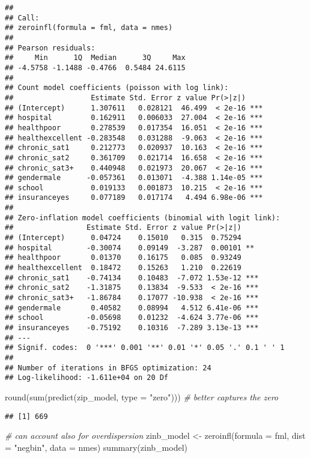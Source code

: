 \documentclass[
  oneside]{book}
\newenvironment{Shaded}{\begin{snugshade}}{\end{snugshade}}
\newcommand{\AttributeTok}[1]{\textcolor[rgb]{0.77,0.63,0.00}{#1}}
\newcommand{\CommentTok}[1]{\textcolor[rgb]{0.56,0.35,0.01}{\textit{#1}}}
\newcommand{\FunctionTok}[1]{\textcolor[rgb]{0.00,0.00,0.00}{#1}}
\newcommand{\NormalTok}[1]{#1}
\newcommand{\OtherTok}[1]{\textcolor[rgb]{0.56,0.35,0.01}{#1}}
\newcommand{\StringTok}[1]{\textcolor[rgb]{0.31,0.60,0.02}{#1}}
\begin{document}
\begin{verbatim}
## 
## Call:
## zeroinfl(formula = fml, data = nmes)
## 
## Pearson residuals:
##     Min      1Q  Median      3Q     Max 
## -4.5758 -1.1488 -0.4766  0.5484 24.6115 
## 
## Count model coefficients (poisson with log link):
##                  Estimate Std. Error z value Pr(>|z|)    
## (Intercept)      1.307611   0.028121  46.499  < 2e-16 ***
## hospital         0.162911   0.006033  27.004  < 2e-16 ***
## healthpoor       0.278539   0.017354  16.051  < 2e-16 ***
## healthexcellent -0.283548   0.031288  -9.063  < 2e-16 ***
## chronic_sat1     0.212773   0.020937  10.163  < 2e-16 ***
## chronic_sat2     0.361709   0.021714  16.658  < 2e-16 ***
## chronic_sat3+    0.440948   0.021973  20.067  < 2e-16 ***
## gendermale      -0.057361   0.013071  -4.388 1.14e-05 ***
## school           0.019133   0.001873  10.215  < 2e-16 ***
## insuranceyes     0.077189   0.017174   4.494 6.98e-06 ***
## 
## Zero-inflation model coefficients (binomial with logit link):
##                 Estimate Std. Error z value Pr(>|z|)    
## (Intercept)      0.04724    0.15010   0.315  0.75294    
## hospital        -0.30074    0.09149  -3.287  0.00101 ** 
## healthpoor       0.01370    0.16175   0.085  0.93249    
## healthexcellent  0.18472    0.15263   1.210  0.22619    
## chronic_sat1    -0.74134    0.10483  -7.072 1.53e-12 ***
## chronic_sat2    -1.31875    0.13834  -9.533  < 2e-16 ***
## chronic_sat3+   -1.86784    0.17077 -10.938  < 2e-16 ***
## gendermale       0.40582    0.08994   4.512 6.41e-06 ***
## school          -0.05698    0.01232  -4.624 3.77e-06 ***
## insuranceyes    -0.75192    0.10316  -7.289 3.13e-13 ***
## ---
## Signif. codes:  0 '***' 0.001 '**' 0.01 '*' 0.05 '.' 0.1 ' ' 1 
## 
## Number of iterations in BFGS optimization: 24 
## Log-likelihood: -1.611e+04 on 20 Df
\end{verbatim}

\begin{Shaded}
\begin{Highlighting}[]
\FunctionTok{round}\NormalTok{(}\FunctionTok{sum}\NormalTok{(}\FunctionTok{predict}\NormalTok{(zip\_model, }\AttributeTok{type =} \StringTok{"zero"}\NormalTok{))) }\CommentTok{\# better captures the zero}
\end{Highlighting}
\end{Shaded}

\begin{verbatim}
## [1] 669
\end{verbatim}

\begin{Shaded}
\begin{Highlighting}[]
\CommentTok{\# can account also for overdispersion}
\NormalTok{zinb\_model }\OtherTok{\textless{}{-}} \FunctionTok{zeroinfl}\NormalTok{(}\AttributeTok{formula =}\NormalTok{ fml, }\AttributeTok{dist =} \StringTok{"negbin"}\NormalTok{, }\AttributeTok{data =}\NormalTok{ nmes)}
\FunctionTok{summary}\NormalTok{(zinb\_model)}
\end{Highlighting}
\end{Shaded}
\end{document}
